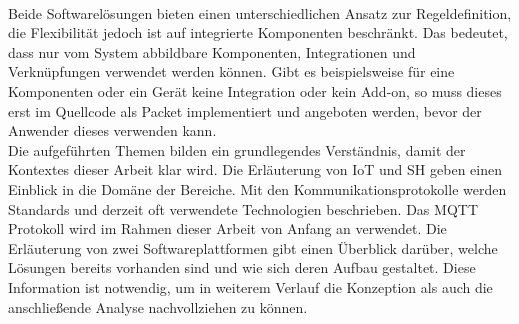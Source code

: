     \\
    Beide Softwarelösungen bieten einen unterschiedlichen Ansatz zur Regeldefinition, die Flexibilität 
    jedoch ist auf integrierte Komponenten beschränkt. Das bedeutet, dass nur vom System abbildbare Komponenten, 
    Integrationen und Verknüpfungen verwendet werden können. Gibt es beispielsweise für eine Komponenten oder ein Gerät keine 
    Integration oder kein Add-on, so muss dieses erst im Quellcode als Packet implementiert und angeboten werden, bevor der 
    Anwender dieses verwenden kann. 
    \\
    \linebreak
    Die aufgeführten Themen bilden ein grundlegendes Verständnis, damit der Kontextes dieser Arbeit klar wird. Die Erläuterung von 
    \acs{IoT} und \acl{SH} geben einen Einblick in die Domäne der Bereiche. Mit den Kommunikationsprotokolle werden Standards 
    und derzeit oft verwendete Technologien beschrieben. Das \acs{MQTT} Protokoll wird im Rahmen dieser Arbeit von Anfang an verwendet. 
    Die Erläuterung von zwei Softwareplattformen gibt einen Überblick 
    darüber, welche Lösungen bereits vorhanden sind und wie sich deren Aufbau gestaltet. Diese Information ist notwendig, um in 
    weiterem Verlauf die Konzeption als auch die anschließende Analyse nachvollziehen zu können.

 